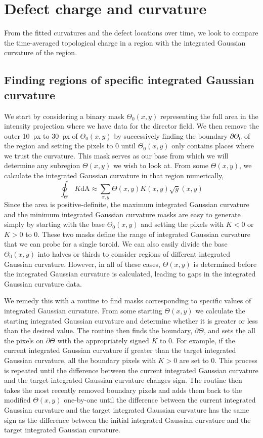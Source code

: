 \section{Defect charge and curvature}
From the fitted curvatures and the defect locations over time, we look to compare the time-averaged topological charge in a region with the integrated Gaussian curvature of the region.


\subsection{Finding regions of specific integrated Gaussian curvature}
We start by considering a binary mask $\Theta_0(x,y)$ representing the full area in the intensity projection where we have data for the director field.
We then remove the outer 10~px to 30~px of $\Theta_0(x,y)$ by successively finding the boundary $\partial \Theta_0$ of the region and setting the pixels to $0$ until $\Theta_0(x,y)$ only contains places where we trust the curvature.
This mask serves as our base from which we will determine any subregion $\Theta(x,y)$ we wish to look at.
From some $\Theta(x,y)$, we calculate the integrated Gaussian curvature in that region numerically,
\begin{equation}
  \oint_{\Theta}\,K\textrm{dA} \approx \sum\limits_{x,y} \Theta(x,y) K(x,y) \sqrt{g}(x,y)
\end{equation}
Since the area is positive-definite, the maximum integrated Gaussian curvature and the minimum integrated Gaussian curvature masks are easy to generate simply by starting with the base $\Theta_0(x,y)$ and setting the pixels with $K < 0$ or $K > 0$ to $0$.
These two masks define the range of integrated Gaussian curvature that we can probe for a single toroid.
We can also easily divide the base $\Theta_0(x,y)$ into halves or thirds to consider regions of different integrated Gaussian curvature.
However, in all of these cases, $\Theta(x,y)$ is determined before the integrated Gaussian curvature is calculated, leading to gaps in the integrated Gaussian curvature data.

We remedy this with a routine to find masks corresponding to specific values of integrated Gaussian curvature.
From some starting $\Theta(x,y)$ we calculate the starting integrated Gaussian curvature and determine whether it is greater or less than the desired value.
The routine then finds the boundary, $\partial \Theta$, and sets the all the pixels on $\partial \Theta$ with the appropriately signed $K$ to $0$.
For example, if the current integrated Gaussian curvature if greater than the target integrated Gaussian curvature, all the boundary pixels with $K > 0$ are set to $0$.
This process is repeated until the difference between the current integrated Gaussian curvature and the target integrated Gaussian curvature changes sign.
The routine then takes the most recently removed boundary pixels and adds them back to the modified $\Theta(x,y)$ one-by-one until the difference between the current integrated Gaussian curvature and the target integrated Gaussian curvature has the same sign as the difference between the initial integrated Gaussian curvature and the target integrated Gaussian curvature.


